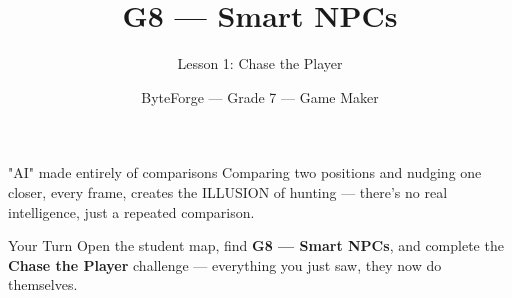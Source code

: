 \documentclass[aspectratio=169]{beamer}
\title{G8 — Smart NPCs}
\subtitle{Lesson 1: Chase the Player}
\author{ByteForge --- Grade 7 --- Game Maker}
\date{}
\begin{document}
\begin{frame}
    \titlepage
\end{frame}

\begin{frame}{"AI" made entirely of comparisons}
    \Large
    Comparing two positions and nudging one closer, every frame, creates the ILLUSION of hunting — there's no real intelligence, just a repeated comparison.
\end{frame}

\begin{frame}{Your Turn}
    \Large
    Open the student map, find \textbf{G8 — Smart NPCs}, and complete
    the \textbf{Chase the Player} challenge --- everything you just saw, they now do themselves.
\end{frame}
\end{document}
